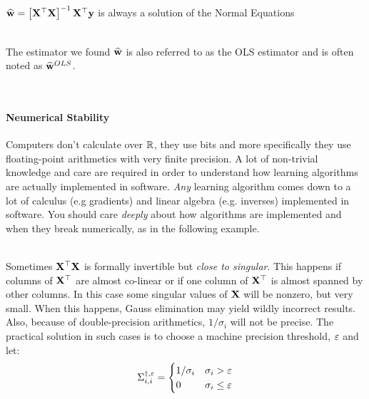 \begin{corollary}$\widehat{\mathbf{w}}=\left[\mathbf{X}^\top\mathbf{X}\right]^{-1}\mathbf{X}^\top\mathbf{y}$ is always a solution of the Normal Equations\end{corollary}

~\\The estimator we found $\widehat{\mathbf{w}}$ is also referred to as the OLS estimator and is often noted as $\widehat{\mathbf{w}}^{OLS}$.

~\\
\paragraph{Neumerical Stability}
Computers don’t calculate over $\mathbb{R}$, they use bits and more specifically they use floating-point arithmetics with very finite precision. A lot of non-trivial knowledge and care are required in order to understand how learning algorithms are actually implemented in software. \textit{Any} learning algorithm comes down to a lot of calculus (e.g gradients) and linear algebra (e.g. inverses) implemented in software. You should care \textit{deeply} about how algorithms are implemented and when they break numerically, as in the following example.

~\\Sometimes $\mathbf{X}^\top\mathbf{X}$ is formally invertible but \textit{close to singular}. This happens if columns of $\mathbf{X}^\top$ are almost co-linear or if one column of $\mathbf{X}^\top$ is almost spanned by other columns. In this case some singular values of $\mathbf{X}$ will be nonzero, but very small. When this happens, Gauss elimination may yield wildly incorrect results. Also, because of double-precision arithmetics, $1/\sigma_i$ will not be precise. The practical solution in such cases is to choose a machine precision threshold, $\varepsilon$ and let: $$ \Sigma^{\dagger,\varepsilon}_{i,i}=\begin{cases} 1/\sigma_i & \sigma_i>\varepsilon \\ 0 & \sigma_i \leq \varepsilon \end{cases} $$

